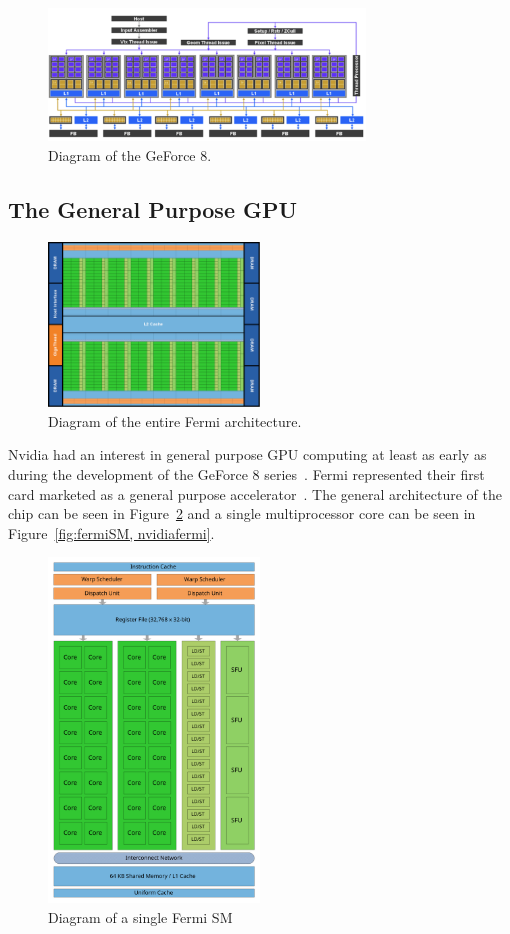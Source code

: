 \begin{figure}[h]
    \centering
    \includegraphics[width=0.75\textwidth]{assets/geforce8.png}
    \caption{Diagram of the GeForce 8.}
    \label{fig:geforce8}
\end{figure}

\subsection{The General Purpose GPU}


\begin{figure}[h]
    \centering
    \includegraphics[width=0.5\textwidth]{assets/fermi_architecture1.png}
    \caption{Diagram of the entire Fermi architecture.}
    \label{fig:fermi}
\end{figure}

Nvidia had an interest in general purpose GPU computing at least as early as during the development
of the GeForce 8 series~\cite{dally2021evolution}.
Fermi represented their first card marketed as a general purpose accelerator~\cite{nvidiafermi}.
The general architecture of the chip can be seen in Figure~\ref{fig:fermi} and a single 
multiprocessor core can be seen in Figure~\ref{fig:fermiSM, nvidiafermi}.


\begin{figure}[h]
    \centering
    \includegraphics[width=0.5\textwidth]{assets/Fermi.png}
    \caption{Diagram of a single Fermi SM} 
    \label{fig:fermiSM}
\end{figure}

